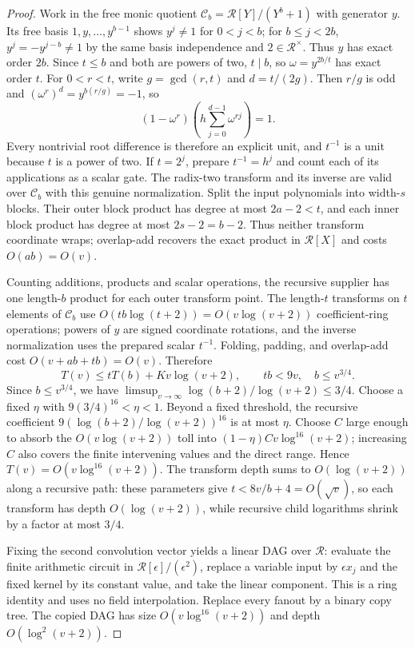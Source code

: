 \begin{proof}
Work in the free monic quotient
$\mathcal C_b=\mathcal R[Y]/(Y^b+1)$ with generator $y$.  Its free basis
$1,y,\ldots,y^{b-1}$ shows $y^j\ne1$ for $0<j<b$; for
$b\leq j<2b$, $y^j=-y^{j-b}\ne1$ by the same basis independence and
$2\in\mathcal R^\times$.  Thus $y$ has exact order $2b$.
Since $t\leq b$ and both are powers of two, $t\mid b$, so
$\omega=y^{2b/t}$ has exact order $t$.  For $0<r<t$, write
$g=\gcd(r,t)$ and $d=t/(2g)$.  Then $r/g$ is odd and
$(\omega^r)^d=y^{b(r/g)}=-1$, so
\[
  (1-\omega^r)\left(h\sum_{j=0}^{d-1}\omega^{rj}\right)=1.
\]
Every nontrivial root difference is therefore an explicit unit, and
$t^{-1}$ is a unit because $t$ is a power of two.  If $t=2^j$, prepare
$t^{-1}=h^j$ and count each of its applications as a scalar gate.  The
radix-two transform and its inverse are valid over $\mathcal C_b$ with
this genuine normalization.  Split the input polynomials into width-$s$
blocks.  Their outer block product has degree at most $2a-2<t$, and
each inner block product has degree at most $2s-2=b-2$.  Thus neither
transform coordinate wraps; overlap-add recovers the exact product in
$\mathcal R[X]$ and costs $O(ab)=O(v)$.

Counting additions, products and scalar operations, the recursive
supplier has one length-$b$ product for each outer transform point.  The
length-$t$ transforms on $t$ elements of $\mathcal C_b$ use
$O(tb\log(t+2))=O(v\log(v+2))$ coefficient-ring operations; powers of
$y$ are signed coordinate rotations, and the inverse normalization uses
the prepared scalar $t^{-1}$.  Folding, padding, and overlap-add cost
$O(v+ab+tb)=O(v)$.  Therefore
\[
  T(v)\leq tT(b)+K v\log(v+2),\qquad tb<9v,\quad b\leq v^{3/4}.
\]
Since $b\leq v^{3/4}$, we have
$\limsup_{v\to\infty}\log(b+2)/\log(v+2)\leq3/4$.  Choose a fixed
$\eta$ with $9(3/4)^{16}<\eta<1$.  Beyond a fixed threshold, the
recursive coefficient
$9(\log(b+2)/\log(v+2))^{16}$ is at most $\eta$.  Choose $C$ large
enough to absorb the $O(v\log(v+2))$ toll into
$(1-\eta)Cv\log^{16}(v+2)$; increasing $C$ also covers the finite
intervening values and the direct range.  Hence
$T(v)=O(v\log^{16}(v+2))$.  The transform depth sums to
$O(\log(v+2))$ along a recursive path: these parameters give
$t<8v/b+4=O(\sqrt v)$, so each transform has depth
$O(\log(v+2))$, while recursive child logarithms shrink by a factor
at most $3/4$.

Fixing the second convolution vector yields a linear DAG over
$\mathcal R$: evaluate the finite arithmetic circuit in
$\mathcal R[\epsilon]/(\epsilon^2)$, replace a variable input by
$\epsilon x_j$ and the fixed kernel by its constant value, and take the
linear component.  This is a ring identity and uses no field
interpolation.  Replace every fanout by a binary copy tree.  The copied
DAG has size $O(v\log^{16}(v+2))$ and depth $O(\log^2(v+2))$.


\end{proof}
